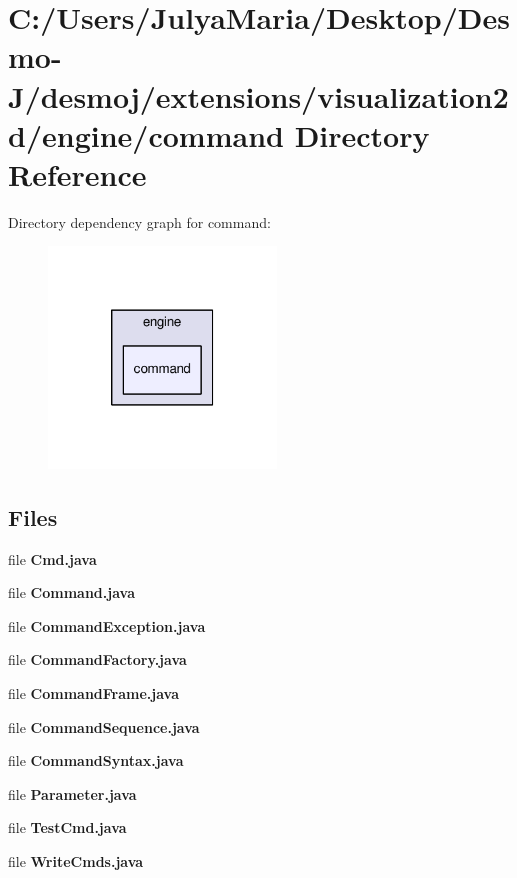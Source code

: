 \section{C\-:/\-Users/\-Julya\-Maria/\-Desktop/\-Desmo-\/\-J/desmoj/extensions/visualization2d/engine/command Directory Reference}
\label{dir_383c751df4db47e6b8f0d360e16cb560}
Directory dependency graph for command\-:
\nopagebreak
\begin{figure}[H]
\begin{center}
\leavevmode
\includegraphics[width=172pt]{dir_383c751df4db47e6b8f0d360e16cb560_dep}
\end{center}
\end{figure}
\subsection*{Files}
\begin{DoxyCompactItemize}
\item 
file {\bfseries Cmd.\-java}
\item 
file {\bfseries Command.\-java}
\item 
file {\bfseries Command\-Exception.\-java}
\item 
file {\bfseries Command\-Factory.\-java}
\item 
file {\bfseries Command\-Frame.\-java}
\item 
file {\bfseries Command\-Sequence.\-java}
\item 
file {\bfseries Command\-Syntax.\-java}
\item 
file {\bfseries Parameter.\-java}
\item 
file {\bfseries Test\-Cmd.\-java}
\item 
file {\bfseries Write\-Cmds.\-java}
\end{DoxyCompactItemize}
